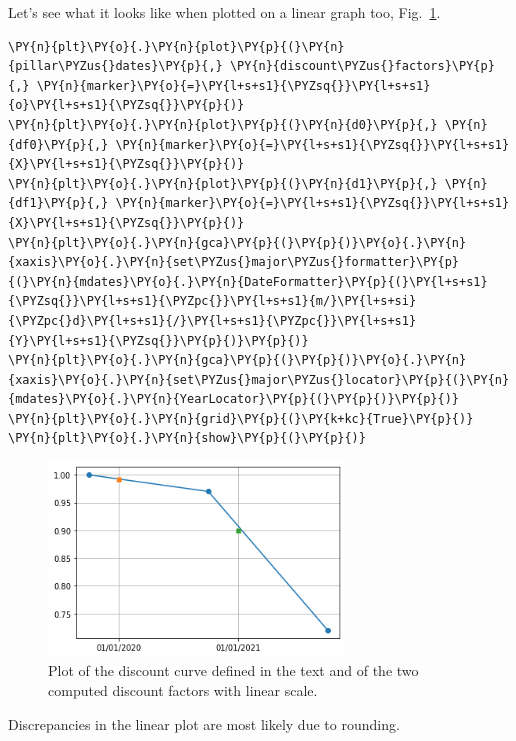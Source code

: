Let's see what it looks like when plotted on a linear graph too, Fig.~\ref{fig:linear_discount_curve}.

\begin{codebox}
\begin{Verbatim}[commandchars=\\\{\}]
\PY{n}{plt}\PY{o}{.}\PY{n}{plot}\PY{p}{(}\PY{n}{pillar\PYZus{}dates}\PY{p}{,} \PY{n}{discount\PYZus{}factors}\PY{p}{,} \PY{n}{marker}\PY{o}{=}\PY{l+s+s1}{\PYZsq{}}\PY{l+s+s1}{o}\PY{l+s+s1}{\PYZsq{}}\PY{p}{)}
\PY{n}{plt}\PY{o}{.}\PY{n}{plot}\PY{p}{(}\PY{n}{d0}\PY{p}{,} \PY{n}{df0}\PY{p}{,} \PY{n}{marker}\PY{o}{=}\PY{l+s+s1}{\PYZsq{}}\PY{l+s+s1}{X}\PY{l+s+s1}{\PYZsq{}}\PY{p}{)}
\PY{n}{plt}\PY{o}{.}\PY{n}{plot}\PY{p}{(}\PY{n}{d1}\PY{p}{,} \PY{n}{df1}\PY{p}{,} \PY{n}{marker}\PY{o}{=}\PY{l+s+s1}{\PYZsq{}}\PY{l+s+s1}{X}\PY{l+s+s1}{\PYZsq{}}\PY{p}{)}
\PY{n}{plt}\PY{o}{.}\PY{n}{gca}\PY{p}{(}\PY{p}{)}\PY{o}{.}\PY{n}{xaxis}\PY{o}{.}\PY{n}{set\PYZus{}major\PYZus{}formatter}\PY{p}{(}\PY{n}{mdates}\PY{o}{.}\PY{n}{DateFormatter}\PY{p}{(}\PY{l+s+s1}{\PYZsq{}}\PY{l+s+s1}{\PYZpc{}}\PY{l+s+s1}{m/}\PY{l+s+si}{\PYZpc{}d}\PY{l+s+s1}{/}\PY{l+s+s1}{\PYZpc{}}\PY{l+s+s1}{Y}\PY{l+s+s1}{\PYZsq{}}\PY{p}{)}\PY{p}{)}
\PY{n}{plt}\PY{o}{.}\PY{n}{gca}\PY{p}{(}\PY{p}{)}\PY{o}{.}\PY{n}{xaxis}\PY{o}{.}\PY{n}{set\PYZus{}major\PYZus{}locator}\PY{p}{(}\PY{n}{mdates}\PY{o}{.}\PY{n}{YearLocator}\PY{p}{(}\PY{p}{)}\PY{p}{)}
\PY{n}{plt}\PY{o}{.}\PY{n}{grid}\PY{p}{(}\PY{k+kc}{True}\PY{p}{)}
\PY{n}{plt}\PY{o}{.}\PY{n}{show}\PY{p}{(}\PY{p}{)}
\end{Verbatim}
\end{codebox}

\begin{figure}[htb]
	\centering
	\includegraphics[width=0.7\textwidth]{figures/linear_discount_curve}
	\caption{Plot of the discount curve defined in the text and of the two computed
		discount factors with linear scale.}
	\label{fig:linear_discount_curve}
\end{figure}
\noindent
Discrepancies in the linear plot are most likely due to rounding.

